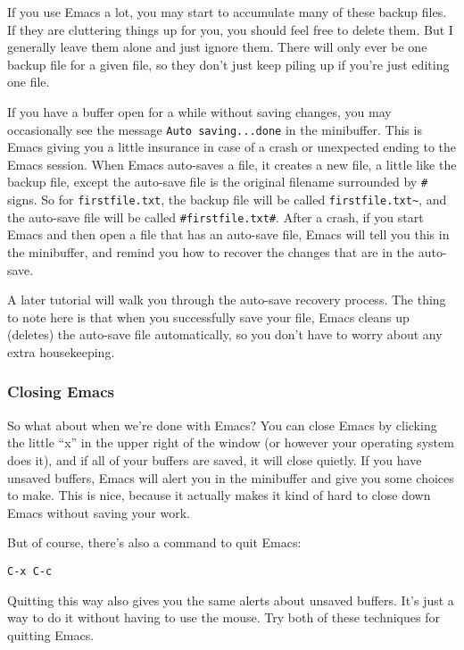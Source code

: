 \documentclass{article}
\begin{document}
If you use Emacs a lot, you may start to accumulate many of these backup files.  If they are cluttering things up for you, you should feel free to delete them.  But I generally leave them alone and just ignore them. There will only ever be one backup file for a given file, so they don't just keep piling up if you're just editing one file.

If you have a buffer open for a while without saving changes, you may occasionally see the message \texttt{Auto saving...done} in the minibuffer. This is Emacs giving you a little insurance in case of a crash or unexpected ending to the Emacs session.  When Emacs auto-saves a file, it creates a new file, a little like the backup file, except the auto-save file is the original filename surrounded by \texttt{\#} signs.  So for \texttt{firstfile.txt}, the backup file will be called \texttt{firstfile.txt\textasciitilde{}}, and the auto-save file will be called \texttt{\#firstfile.txt\#}.  After a crash, if you start Emacs and then open a file that has an auto-save file, Emacs will tell you this in the minibuffer, and remind you how to recover the changes that are in the auto-save.

A later tutorial will walk you through the auto-save recovery process. The thing to note here is that when you successfully save your file, Emacs cleans up (deletes) the auto-save file automatically, so you don't have to worry about any extra housekeeping.
\subsubsection{Closing Emacs}
\label{sec-4-2-11}

So what about when we're done with Emacs?  You can close Emacs by clicking the little ``x'' in the upper right of the window (or however your operating system does it), and if all of your buffers are saved, it will close quietly. If you have unsaved buffers, Emacs will alert you in the minibuffer and give you some choices to make.  This is nice, because it actually makes it kind of hard to close down Emacs without saving your work.

But of course, there's also a command to quit Emacs:


\begin{verbatim}
C-x C-c
\end{verbatim}

Quitting this way also gives you the same alerts about unsaved buffers.  It's just a way to do it without having to use the mouse. Try both of these techniques for quitting Emacs.
\end{document}
